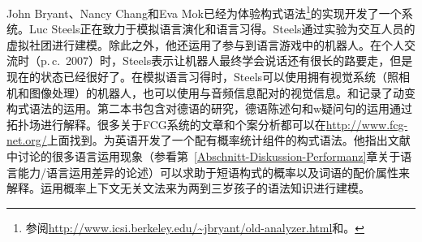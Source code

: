 John Bryant、Nancy Chang和Eva Mok已经为体验构式语法\footnote{
  参阅\url{http://www.icsi.berkeley.edu/~jbryant/old-analyzer.html}和。
}的实现开发了一个系统。Luc Steels正在致力于模拟语言演化和语言习得\citep{Steels2003a}。Steels通过实验为交互人员的虚拟社团进行建模。除此之外，他还运用了参与到语言游戏中的机器人\citep{Steels2015a-u}。在个人交流时（p.\,c.\ 2007）时，Steels表示让机器人最终学会说话还有很长的路要走，但是现在的状态已经很好了。在模拟语言习得时，Steels可以使用拥有视觉系统（照相机和图像处理）的机器人，也可以使用与音频信息配对的视觉信息。和记录了动变构式语法的运用。第二本书包含对德语的研究，德语陈述句和w疑问句的运用通过拓扑场进行解释\citep{Micelli2012a}。很多关于FCG系统的文章和个案分析都可以在\url{http://www.fcg-net.org/}上面找到。\citet{Jurafsky96a}为英语开发了一个配有概率统计组件的构式语法。他指出文献中讨论的很多语言运用现象（参看第~\ref{Abschnitt-Diskussion-Performanz}章关于语言能力/语言运用差异的论述）可以求助于短语构式的概率以及词语的配价属性来解释。\citet*{BLT2009a}运用概率上下文无关文法来为两到三岁孩子的语法知识进行建模。
